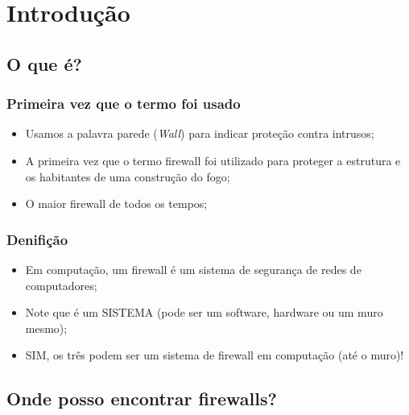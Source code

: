 \section{Introdução} 

\subsection{O que é?} %

\begin{frame}
	\frametitle{Primeira vez que o termo foi usado}

	\begin{itemize}
		\item Usamos a palavra parede (\textit{Wall}) para indicar proteção contra intrusos;
		\item A primeira vez que o termo firewall foi utilizado para proteger a estrutura e os habitantes de uma construção do fogo;
		\item O maior firewall de todos os tempos;
	\end{itemize}

\end{frame}
\begin{frame}
	\frametitle{Denifição}

	\begin{itemize}
		\item Em computação, um firewall é um sistema de segurança de redes de computadores;
		\item Note que é um SISTEMA (pode ser um software, hardware ou um muro mesmo);
		\item SIM, os três podem ser um sistema de firewall em computação (até o muro)!
	\end{itemize}

\end{frame}


\newcommand{\ondefire}[3]{
	\begin{frame}
		\frametitle{#1}
		\begin{figure}
			\centering
			\texttt{[image: imagens/\#3]}
			\caption{#2}
		\end{figure}
	\end{frame}
}

\subsection{Onde posso encontrar firewalls?}

